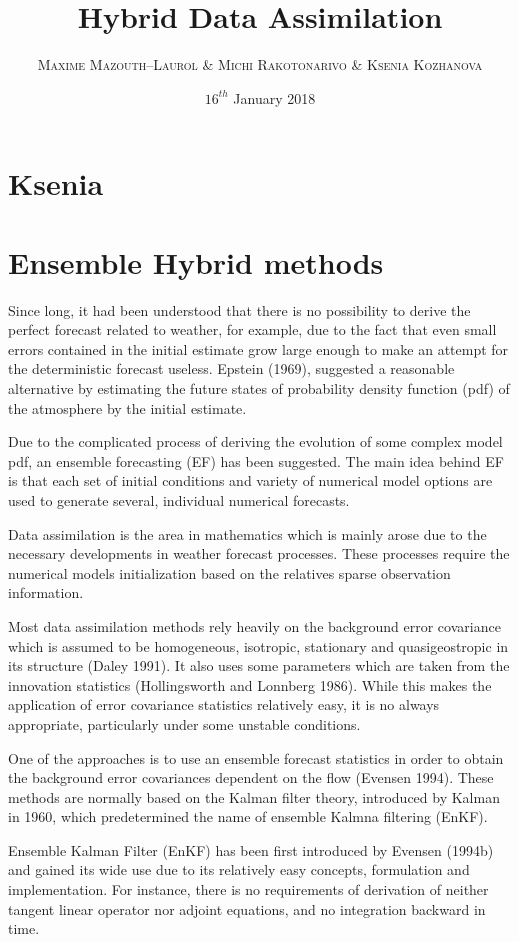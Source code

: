 \documentclass[a4,12pt]{article}
\title{\textbf{Hybrid Data Assimilation}}
\author{
\begin{tabular}{cc}
	\textsc{Maxime Mazouth--Laurol} \& \textsc{Michi Rakotonarivo} \& \textsc{Ksenia Kozhanova}
\end{tabular}}
\date{\small $16^{th}$ January 2018}
\numberwithin{equation}{section}
\begin{document}
\maketitle

\section{Ksenia}
\section{Ensemble Hybrid methods}

Since long, it had been understood that there is no possibility to derive the perfect forecast related to weather, for example, due to the fact that even small errors contained in the initial estimate grow large enough to make an attempt for the deterministic forecast useless. Epstein (1969), suggested a reasonable alternative by estimating the future states of probability density function (pdf)  of the atmosphere by the initial estimate.

Due to the complicated process of deriving the evolution of some complex model pdf, an ensemble forecasting (EF) has been suggested. The main idea behind EF is that each set of initial conditions and variety of numerical model options are used to generate several, individual numerical forecasts.

Data assimilation is the area in mathematics which is mainly arose due to the necessary developments in weather forecast processes. These processes require the numerical models initialization based on the relatives sparse observation information.  

Most data assimilation methods rely heavily on the background error covariance which is assumed to be homogeneous, isotropic, stationary and quasigeostropic in its structure (Daley 1991). It also uses some parameters which are taken from the innovation statistics (Hollingsworth and
Lonnberg 1986). While this makes the application of error covariance statistics relatively easy, it is no always appropriate, particularly under some unstable conditions.

One of the approaches is to use an ensemble forecast statistics in order to obtain the background error covariances dependent on the flow (Evensen 1994). These methods are normally based on the Kalman filter theory, introduced by Kalman in 1960, which predetermined the name of ensemble Kalmna filtering (EnKF).

Ensemble Kalman Filter (EnKF) has been first introduced by Evensen (1994b) and gained its wide use due to its relatively easy concepts, formulation and implementation. For instance, there is no requirements of derivation of neither tangent linear operator nor adjoint equations, and no integration backward in time.
\end{document}
